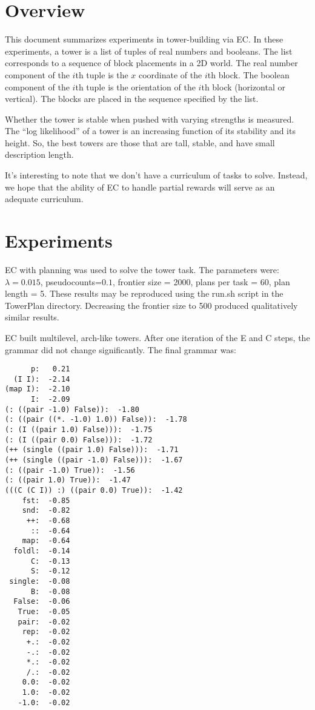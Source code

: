 \documentclass{article}
\begin{document}
\section{Overview}
This document summarizes experiments in tower-building via EC.
In these experiments, a tower is a list of tuples of real numbers and booleans.
The list corresponds to a sequence of block placements in a 2D world.
The real number component of the $i$th tuple is the $x$ coordinate of the $i$th block.
The boolean component of the $i$th tuple is the orientation of the $i$th block (horizontal or vertical).
The blocks are placed in the sequence specified by the list.

Whether the tower is stable when pushed with varying strengths is measured.
The ``log likelihood'' of a tower is an increasing function of its stability and its height.
So, the best towers are those that are tall, stable, and have small description length.

It's interesting to note that we don't have a curriculum of tasks to solve.
Instead, we hope that the ability of EC to handle partial rewards will serve as an adequate curriculum.

\section{Experiments}
EC with planning was used to solve the tower task. The parameters were: $\lambda=0.015$, pseudocounts=$0.1$, frontier size = 2000, plans per task = 60, plan length = 5.
These results may be reproduced using the run.sh script in the TowerPlan directory.
Decreasing the frontier size to 500 produced qualitatively similar results.

EC built multilevel, arch-like towers.
After one iteration of the E and C steps, the grammar did not change significantly.
The final grammar was:
\begin{verbatim}
      p:   0.21
  (I I):  -2.14
(map I):  -2.10
      I:  -2.09
(: ((pair -1.0) False)):  -1.80
(: ((pair ((*. -1.0) 1.0)) False)):  -1.78
(: (I ((pair 1.0) False))):  -1.75
(: (I ((pair 0.0) False))):  -1.72
(++ (single ((pair 1.0) False))):  -1.71
(++ (single ((pair -1.0) False))):  -1.67
(: ((pair -1.0) True)):  -1.56
(: ((pair 1.0) True)):  -1.47
(((C (C I)) :) ((pair 0.0) True)):  -1.42
    fst:  -0.85
    snd:  -0.82
     ++:  -0.68
      ::  -0.64
    map:  -0.64
  foldl:  -0.14
      C:  -0.13
      S:  -0.12
 single:  -0.08
      B:  -0.08
  False:  -0.06
   True:  -0.05
   pair:  -0.02
    rep:  -0.02
     +.:  -0.02
     -.:  -0.02
     *.:  -0.02
     /.:  -0.02
    0.0:  -0.02
    1.0:  -0.02
   -1.0:  -0.02
\end{verbatim}
\end{document}
